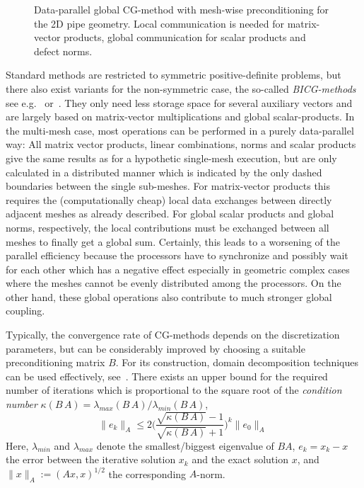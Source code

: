 \begin{figure}[ht]
\begin{center}

\caption{Data-parallel global CG-method with mesh-wise preconditioning for the 2D pipe geometry. Local communication is needed for matrix-vector products, global communication for scalar products and defect norms.} 
\label{FIG_SCARC_cg_method}
\end{center}
\end{figure}

Standard methods are restricted to symmetric positive-definite problems, but
there also exist variants for the non-symmetric case, the so-called {\it BICG-methods} see e.g.~\cite{Saad:2003} or~\cite{Axelsson:1998}.
%
They only need less storage space for several auxiliary vectors and are largely based on matrix-vector multiplications and global scalar-products.
In the multi-mesh case, most operations can be performed in a purely data-parallel way: All matrix vector products, linear combinations, norms and scalar products give the same results as for a hypothetic single-mesh execution, but are only calculated in a distributed manner which is indicated by the only dashed boundaries between the single sub-meshes. For matrix-vector products this requires the (computationally cheap) local data exchanges between directly adjacent meshes as already described. For global scalar products %
and global norms, respectively, the local contributions must be exchanged between all meshes to finally get a global sum. Certainly, this leads to a worsening of the parallel efficiency because the processors have to synchronize and possibly wait for each other which has a negative effect especially in geometric complex cases where the meshes cannot be evenly distributed among the processors. On the other hand, these global operations also contribute to much stronger global coupling.

Typically, the convergence rate of CG-methods  depends on the discretization parameters, but can be considerably improved by choosing a suitable preconditioning matrix $B$. For its construction, domain decomposition techniques can be used effectively, see~\cite{Bramble:1991}.
There exists an upper bound for the required number of iterations which is
proportional to the square root of the {\it condition number} $\kappa (B \, A) = \lambda_{max} (B \, A) / \lambda_{min} (B\, A)$,
\[ \| e_k \|_A \leq 2 \big(\frac{\sqrt{\kappa (B \,A)} -1}{\sqrt{\kappa (B \,A)} +1}\big)^k \| e_0\|_A\,\]  
Here, $\lambda_{min}$ and $\lambda_{max}$ denote the smallest/biggest eigenvalue of $B A$, $e_k= x_k - x$ the error between the iterative solution $x_k$ and the exact solution $x$, and  $\|x\|_A := (Ax,x) ^{1/2}$ the corresponding $A$-norm.

